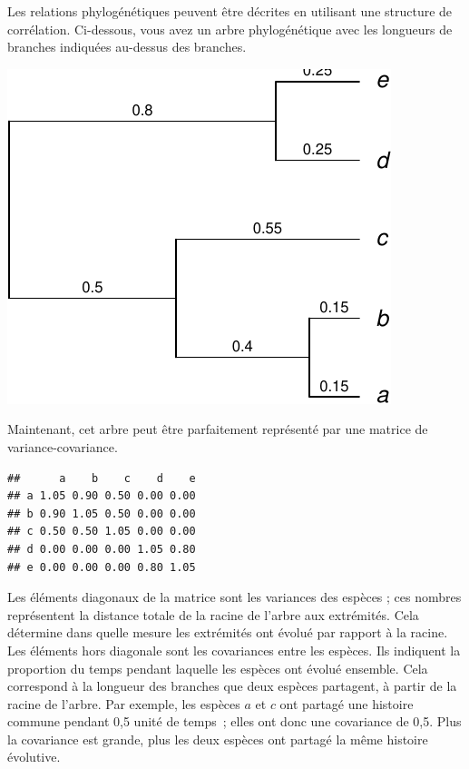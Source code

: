 \documentclass[
]{book}
\begin{document}
Les relations phylogénétiques peuvent être décrites en utilisant une structure de corrélation. Ci-dessous, vous avez un arbre phylogénétique avec les longueurs de branches indiquées au-dessus des branches.

\begin{flushleft}\includegraphics{pcm-workshop_files/figure-latex/phylogenetic tree example-1} \end{flushleft}

Maintenant, cet arbre peut être parfaitement représenté par une matrice de variance-covariance.

\begin{verbatim}
##      a    b    c    d    e
## a 1.05 0.90 0.50 0.00 0.00
## b 0.90 1.05 0.50 0.00 0.00
## c 0.50 0.50 1.05 0.00 0.00
## d 0.00 0.00 0.00 1.05 0.80
## e 0.00 0.00 0.00 0.80 1.05
\end{verbatim}

Les éléments diagonaux de la matrice sont les variances des espèces ; ces nombres représentent la distance totale de la racine de l'arbre aux extrémités. Cela détermine dans quelle mesure les extrémités ont évolué par rapport à la racine. Les éléments hors diagonale sont les covariances entre les espèces. Ils indiquent la proportion du temps pendant laquelle les espèces ont évolué ensemble. Cela correspond à la longueur des branches que deux espèces partagent, à partir de la racine de l'arbre. Par exemple, les espèces \(a\) et \(c\) ont partagé une histoire commune pendant 0,5 unité de temps~; elles ont donc une covariance de 0,5. Plus la covariance est grande, plus les deux espèces ont partagé la même histoire évolutive.
\end{document}
